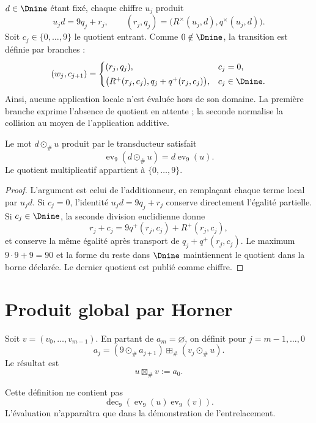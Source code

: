\begin{algorithm}
$d\in\Dnine$ étant fixé, chaque chiffre $u_j$ produit
\[
 u_jd=9q_j+r_j,
 \qquad
 (r_j,q_j)=\bigl(R^\times(u_j,d),q^\times(u_j,d)\bigr).
\]
Soit $c_j\in\{0,\ldots,9\}$ le quotient entrant. Comme $0\notin\Dnine$,
la transition est définie par branches :
\[
 (w_j,c_{j+1})=
 \begin{cases}
 (r_j,q_j),&c_j=0,\\[1mm]
 \bigl(R^+(r_j,c_j),q_j+q^+(r_j,c_j)\bigr),&c_j\in\Dnine.
 \end{cases}
\]
Ainsi, aucune application locale n'est évaluée hors de son domaine. La première
branche exprime l'absence de quotient en attente ; la seconde normalise la
collision au moyen de l'application additive.
\end{algorithm}

\begin{lemma}
Le mot $d\odot_\#u$ produit par le transducteur satisfait
\[
 \operatorname{ev}_9(d\odot_\#u)
 =d\operatorname{ev}_9(u).
\]
Le quotient multiplicatif appartient à $\{0,\ldots,9\}$.
\end{lemma}

\begin{proof}
L'argument est celui de l'additionneur, en remplaçant chaque terme local par
$u_jd$. Si $c_j=0$, l'identité
$u_jd=9q_j+r_j$ conserve directement l'égalité partielle. Si
$c_j\in\Dnine$, la seconde division euclidienne donne
\[
 r_j+c_j=9q^+(r_j,c_j)+R^+(r_j,c_j),
\]
et conserve la même égalité après transport de
$q_j+q^+(r_j,c_j)$. Le maximum $9\cdot9+9=90$ et la forme du reste dans
$\Dnine$ maintiennent le quotient dans la borne déclarée. Le dernier quotient est
publié comme chiffre.
\end{proof}

\section{Produit global par Horner}

\begin{definition}
Soit $v=(v_0,\ldots,v_{m-1})$. En partant de $a_m=\varnothing$, on définit pour
$j=m-1,\ldots,0$
\[
 a_j=(9\odot_\#a_{j+1})\boxplus_\#(v_j\odot_\#u).
\]
Le résultat est
\[
 u\boxtimes_\#v:=a_0.
\]
\end{definition}

Cette définition ne contient pas
\[
 \operatorname{dec}_9(\operatorname{ev}_9(u)\operatorname{ev}_9(v)).
\]
L'évaluation n'apparaîtra que dans la démonstration de l'entrelacement.

